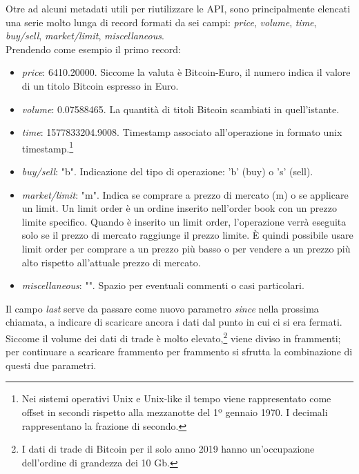 \documentclass[a4paper,12pt]{report}
\begin{document}
\begin{itemize}
	Otre ad alcuni metadati utili per riutilizzare le API, sono principalmente elencati una serie molto lunga di record formati da sei campi: \textit{price}, \textit{volume}, \textit{time}, \textit{buy/sell}, \textit{market/limit}, \textit{miscellaneous}.\\ Prendendo come esempio il primo record:
	\begin{itemize}
		\item \textit{price}: 6410.20000. Siccome la valuta è Bitcoin-Euro, il numero indica il valore di un titolo Bitcoin espresso in Euro.
		\item \textit{volume}: 0.07588465. La quantità di titoli Bitcoin scambiati in quell'istante.
		\item \textit{time}: 1577833204.9008. Timestamp associato all'operazione in formato unix timestamp.\footnote{Nei sistemi operativi Unix e Unix-like il tempo viene rappresentato come offset in secondi rispetto alla mezzanotte del 1º gennaio 1970. I decimali rappresentano la frazione di secondo.}
		\item \textit{buy/sell}: "b". Indicazione del tipo di operazione: 'b' (buy) o 's' (sell).
		\item \textit{market/limit}: "m". Indica se comprare a prezzo di mercato (m) o se applicare un limit. Un limit order è un ordine inserito nell’order book con un prezzo limite specifico. Quando è inserito un limit order, l’operazione verrà eseguita solo se il prezzo di mercato raggiunge il prezzo limite. È quindi possibile usare limit order per comprare a un prezzo più basso o per vendere a un prezzo più alto rispetto all’attuale prezzo di mercato.
		\item \textit{miscellaneous}: "". Spazio per eventuali commenti o casi particolari.
	\end{itemize}
	
	
	Il campo \textit{last} serve da passare come nuovo parametro \textit{since} nella prossima chiamata, a indicare di scaricare ancora i dati dal punto in cui ci si era fermati. Siccome il volume dei dati di trade è molto elevato,\footnote{I dati di trade di Bitcoin per il solo anno 2019 hanno un'occupazione dell'ordine di grandezza dei 10 Gb.} viene diviso in frammenti; per continuare a scaricare frammento per frammento si sfrutta la combinazione di questi due parametri.
	

\end{itemize}
\end{document}
